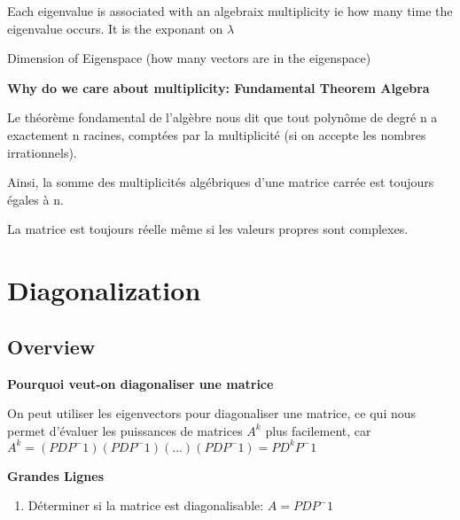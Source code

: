 \documentclass{article}
\begin{document}
\begin{definition}
    Each eigenvalue is associated with an algebraix multiplicity ie how
    many time the eigenvalue occurs. It is the exponant on $\lambda$
\end{definition}

\begin{definition}
    Dimension of Eigenspace (how many vectors are in the eigenspace)
\end{definition}

\textbf{Why do we care about multiplicity: Fundamental Theorem Algebra}

\begin{theorem}
\end{theorem}

Le théorème fondamental de l'algèbre nous dit que tout polynôme de degré
n a exactement n racines, comptées par la multiplicité (si on accepte les
nombres irrationnels).

Ainsi, la somme des multiplicités algébriques d'une matrice carrée est
toujours égales à n.

\begin{remark}
    La matrice est toujours réelle même si les valeurs propres sont complexes.
\end{remark}

\section{Diagonalization}%
\label{sec:Diagonalization}

\subsection{Overview}%
\label{sub:Overview}

\textbf{Pourquoi veut-on diagonaliser une matrice}

On peut utiliser les eigenvectors pour diagonaliser une matrice, ce qui
nous permet d'évaluer les puissances de matrices $A^k$ plus facilement, car
$ A^k = (PDP^-1)(PDP^-1)(...)(PDP^-1) = PD^k P^-1 $

\textbf{Grandes Lignes}

\begin{enumerate}
    \item Déterminer si la matrice est diagonalisable: $ A = PDP^-1 $
\end{enumerate}
\end{document}
